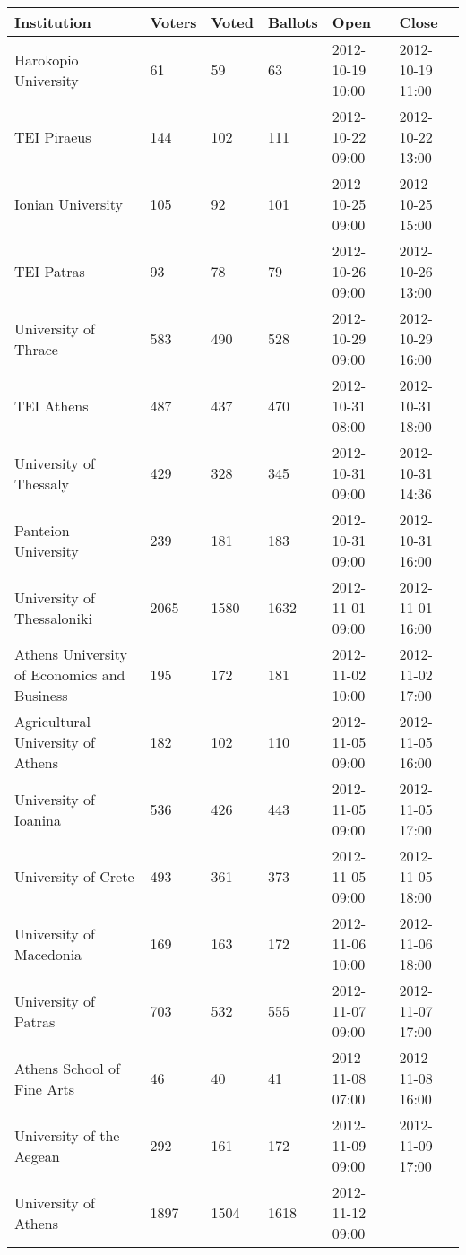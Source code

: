 \documentclass[letterpaper,10pt]{article}
\begin{document}
\begin{table*}[t]
  \begin{threeparttable}
    \begin{tabular}{llllll}
      \hline
      Institution & Voters & Voted & Ballots & Open & Close\\
      \hline
      Harokopio University & 61 & 59 & 63 & 2012-10-19 10:00 & 2012-10-19 11:00\\
      TEI Piraeus & 144 & 102 & 111 & 2012-10-22 09:00 & 2012-10-22 13:00\\
      Ionian University & 105 & 92 & 101 & 2012-10-25 09:00 & 2012-10-25 15:00\\
      TEI Patras & 93 & 78 & 79 & 2012-10-26 09:00 & 2012-10-26 13:00\\
      University of Thrace & 583 & 490 & 528 & 2012-10-29 09:00 & 
      2012-10-29 16:00\\
      TEI Athens & 487 & 437 & 470 & 2012-10-31 08:00 & 2012-10-31 18:00\\
      University of Thessaly & 429 & 328 & 345 & 2012-10-31 09:00 & 
      2012-10-31 14:36\\
      Panteion University & 239 & 181 & 183 & 2012-10-31 09:00 & 
      2012-10-31 16:00\\
      University of Thessaloniki & 2065 & 1580 & 1632 & 2012-11-01 09:00 
      & 2012-11-01 16:00\\
      Athens University of Economics and Business & 195 & 172 & 181 & 
      2012-11-02 10:00 & 2012-11-02 17:00\\
      Agricultural University of Athens & 182 & 102 & 110 
      & 2012-11-05 09:00 & 2012-11-05 16:00\\
      University of Ioanina & 536 & 426 & 443 & 2012-11-05 09:00 &
      2012-11-05 17:00\\
      University of Crete & 493 & 361 & 373 & 2012-11-05 09:00 & 
      2012-11-05 18:00\\
      University of Macedonia & 169 & 163 & 172 & 2012-11-06 10:00 & 
      2012-11-06 18:00\\
      University of Patras & 703 & 532 & 555 & 2012-11-07 09:00 & 
      2012-11-07 17:00\\
      Athens School of Fine Arts & 46 & 40 & 41 & 2012-11-08 07:00 & 
      2012-11-08 16:00\\
      University of the Aegean & 292 & 161 & 172 & 2012-11-09 09:00 & 
      2012-11-09 17:00\\
      University of Athens & 1897 & 1504 & 1618 & 2012-11-12 09:00 & 

\end{tabular}
\end{threeparttable}
\end{table*}
\end{document}
